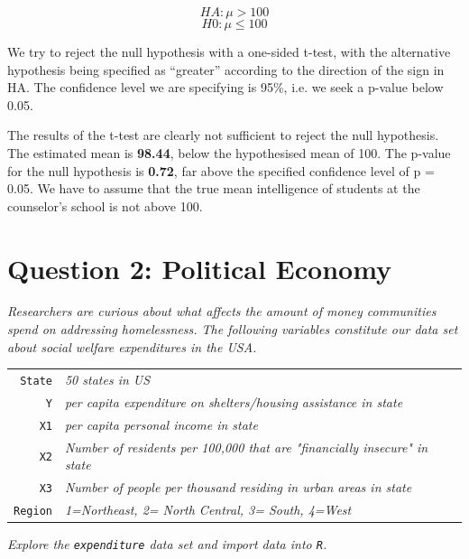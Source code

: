 \documentclass[12pt,a4paper]{article}
\begin{document}
\[HA: \mu > 100\]\[H0: \mu \leq 100\]

We try to reject the null hypothesis with a one-sided t-test, with the alternative hypothesis being specified as “greater” according to the direction of the sign in HA. The confidence level we are specifying is 95\%, i.e. we seek a p-value below 0.05.



The results of the t-test are clearly not sufficient to reject the null hypothesis. The estimated mean is \textbf{98.44}, below the hypothesised mean of 100. The p-value for the null hypothesis is \textbf{0.72}, far above the specified confidence level of p = 0.05. We have to assume that the true mean intelligence of students at the counselor’s school is not above 100.\pagebreak

\section{Question 2: Political Economy}

\textit{Researchers are curious about what affects the amount of money communities spend on addressing homelessness. The following variables constitute our data set about social welfare expenditures in the USA.} \\
\vspace{.5cm}

\begin{tabular}{r|l}
	\texttt{State} &\emph{50 states in US} \\
	\texttt{Y} & \emph{per capita expenditure on shelters/housing assistance in state}\\
	\texttt{X1} &\emph{per capita personal income in state} \\
	\texttt{X2} &  \emph{Number of residents per 100,000 that are "financially insecure" in state}\\
	\texttt{X3} &  \emph{Number of people per thousand residing in urban areas in state} \\
	\texttt{Region} &  \emph{1=Northeast, 2= North Central, 3= South, 4=West} \\
\end{tabular}

\vspace{.5cm}
\textit{Explore the \texttt{expenditure} data set and import data into \texttt{R}.}
\vspace{.5cm}


\end{document}
